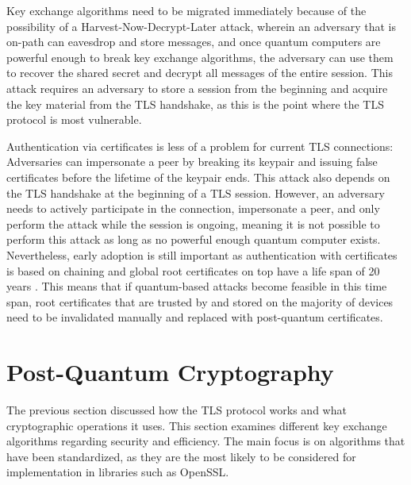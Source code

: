 \documentclass[public,noindent]{aisecreport}
\begin{document}
Key exchange algorithms need to be migrated immediately because of the possibility of a Harvest-Now-Decrypt-Later attack, wherein an adversary that is on-path can eavesdrop and store messages, and once quantum computers are powerful enough to break key exchange algorithms, the adversary can use them to recover the shared secret and decrypt all messages of the entire session. This attack requires an adversary to store a session from the beginning and acquire the key material from the TLS handshake, as this is the point where the TLS protocol is most vulnerable. 

Authentication via certificates is less of a problem for current TLS connections: Adversaries can impersonate a peer by breaking its keypair and issuing false certificates before the lifetime of the keypair ends. This attack also depends on the TLS handshake at the beginning of a TLS session. However, an adversary needs to actively participate in the connection, impersonate a peer, and only perform the attack while the session is ongoing, meaning it is not possible to perform this attack as long as no powerful enough quantum computer exists. Nevertheless, early adoption is still important as authentication with certificates is based on chaining and global root certificates on top have a life span of 20 years \cite{ietf-uta-pqc-app-00}. This means that if quantum-based attacks become feasible in this time span, root certificates that are trusted by and stored on the majority of devices need to be invalidated manually and replaced with post-quantum certificates.

\section{Post-Quantum Cryptography}

The previous section discussed how the TLS protocol works and what cryptographic operations it uses. This section examines different key exchange algorithms regarding security and efficiency. The main focus is on algorithms that have been standardized, as they are the most likely to be considered for implementation in libraries such as OpenSSL. 
\end{document}
